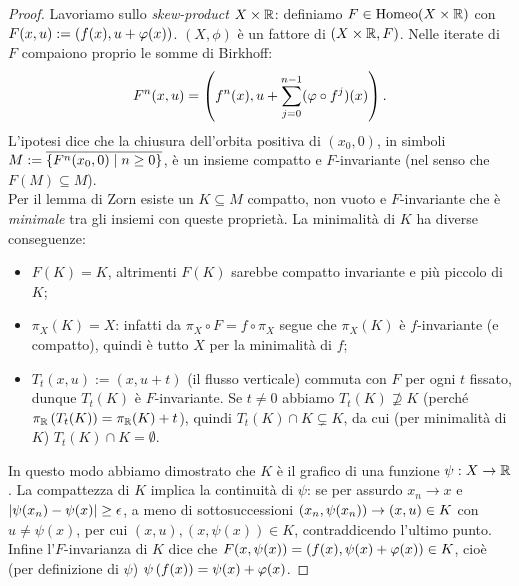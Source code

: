 \begin{proof} Lavoriamo sullo \emph{skew-product} $X\times\mathbb{R}$: definiamo $F\in\operatorname{Homeo}(X\times\mathbb{R})$
con $F(x,u):=\left(f(x),u+\varphi(x)\right)$. $(X,\phi)$ è un fattore di $(X\times\mathbb{R},F)$.
Nelle iterate di $F$ compaiono proprio le somme di Birkhoff:
\[ F^n(x,u)=\left(f^n(x),u+\sum_{j=0}^{n-1}(\varphi\circ f^j)(x)\right). \]
L'ipotesi dice che la chiusura dell'orbita positiva di $(x_0,0)$, in simboli
$M:=\overline{\left\{F^n(x_0,0)\mid n\ge 0\right\}}$, è un insieme compatto e $F$-invariante (nel senso che $F(M)\subseteq M$). \\
Per il lemma di Zorn esiste un $K\subseteq M$ compatto, non vuoto e $F$-invariante che è \emph{minimale} tra gli insiemi
con queste proprietà. La minimalità di $K$ ha diverse conseguenze:
\begin{itemize}
	\item $F(K)=K$, altrimenti $F(K)$ sarebbe compatto invariante e più piccolo di $K$;
	\item $\pi_X(K)=X$: infatti da $\pi_X\circ F=f\circ\pi_X$ segue che $\pi_X(K)$ è $f$-invariante (e compatto),
	quindi è tutto $X$ per la minimalità di $f$;
	\item $T_t(x,u):=(x,u+t)$ (il flusso verticale) commuta con $F$ per ogni $t$ fissato, dunque
	$T_t(K)$ è $F$-invariante. Se $t\neq 0$ abbiamo $T_t(K)\nsupseteq K$ (perché $\pi_{\mathbb{R}}\left(T_t(K)\right)=\pi_{\mathbb{R}}(K)+t$),
	quindi $T_t(K)\cap K\subsetneq K$, da cui (per minimalità di $K$) $T_t(K)\cap K=\emptyset$.
\end{itemize}
In questo modo abbiamo dimostrato che $K$ è il grafico di una funzione $\psi:X\to\mathbb{R}$. La compattezza di $K$
implica la continuità di $\psi$: se per assurdo $x_n\to x$ e $\left|\psi(x_n)-\psi(x)\right|\ge\epsilon$,
a meno di sottosuccessioni $\left(x_n,\psi(x_n)\right)\to (x,u)\in K$ con $u\neq\psi(x)$, per cui
$(x,u),(x,\psi(x))\in K$, contraddicendo l'ultimo punto. \\
Infine l'$F$-invarianza di $K$ dice che $F(x,\psi(x))=\left(f(x),\psi(x)+\varphi(x)\right)\in K$, cioè (per definizione di $\psi$)
$\psi\left(f(x)\right)=\psi(x)+\varphi(x)$.
\end{proof}

